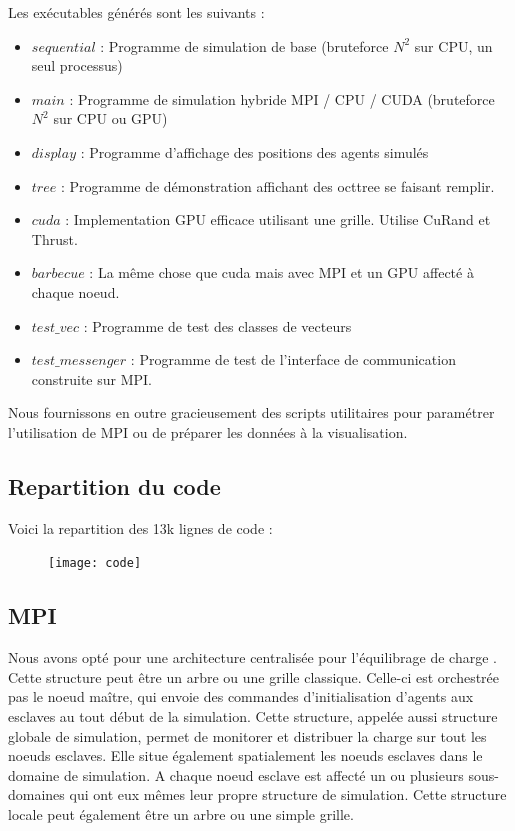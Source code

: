 Les exécutables générés sont les suivants :
\begin{itemize}
    \item $sequential$ : Programme de simulation de base (bruteforce $N^2$ sur CPU, un seul processus)
    \item $main$ : Programme de simulation hybride MPI / CPU / CUDA (bruteforce $N^2$ sur CPU ou GPU)
    \item $display$ : Programme d'affichage des positions des agents simulés 
    \item $tree$ : Programme de démonstration affichant des octtree se faisant remplir.
    \item $cuda$ : Implementation GPU efficace utilisant une grille. Utilise CuRand et Thrust.
    \item $barbecue$ : La même chose que cuda mais avec MPI et un GPU affecté à chaque noeud.
    \item $test\_vec$ : Programme de test des classes de vecteurs
    \item $test\_messenger$ : Programme de test de l'interface de communication construite sur MPI.
\end{itemize}

Nous fournissons en outre gracieusement des scripts utilitaires pour paramétrer l'utilisation de MPI ou de préparer les données à la visualisation.

\subsection{Repartition du code}

Voici la repartition des 13k lignes de code :
    
\begin{figure}[h]
    \begin{center}
            \texttt{[image: code]} \\
    \end{center}
\end{figure}





\subsection{MPI}
Nous avons opté pour une architecture centralisée pour l'équilibrage de charge . Cette structure peut être un arbre ou une grille classique.
Celle-ci est orchestrée pas le noeud maître, qui envoie des commandes d'initialisation d'agents aux esclaves au tout début de la simulation.
Cette structure, appelée aussi structure globale de simulation, permet de monitorer et distribuer la charge sur tout les noeuds esclaves. Elle situe également spatialement les noeuds esclaves dans le domaine de simulation.
A chaque noeud esclave est affecté un ou plusieurs sous-domaines qui ont eux mêmes leur propre structure de simulation. 
Cette structure locale peut également être un arbre ou une simple grille.

